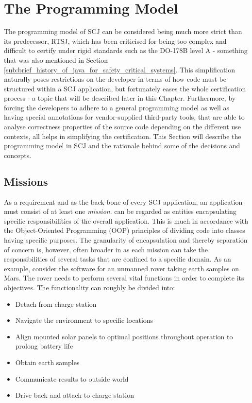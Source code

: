 \section{The Programming Model}
\label{section:programmingmodel}
The programming model of SCJ can be considered being much more strict than its predecessor, RTSJ, which has been criticised for being too complex and difficult to certify under rigid standards such as the DO-178B level A - something that was also mentioned in Section \ref{sub:brief_history_of_java_for_safety_critical_systems}. This simplification naturally poses restrictions on the developer in terms of how code must be structured within a SCJ application, but fortunately eases the whole certification process - a topic that will be described later in this Chapter. Furthermore, by forcing the developers to adhere to a general programming model as well as having special annotations for vendor-supplied third-party tools, that are able to analyse correctness properties of the source code depending on the different use contexts, all helps in simplifying the certification. This Section will describe the programming model in SCJ and the rationale behind some of the decisions and concepts.


\subsection{Missions}
As a requirement and as the back-bone of every SCJ application, an application must consist of at least one \textit{mission}.  can be regarded as entities encapsulating specific responsibilities of the overall application. This is much in accordance with the Object-Oriented Programming (OOP) principles of dividing code into classes having specific purposes. The granularity of encapsulation and thereby separation of concern is, however, often broader in  as each mission can take the responsibilities of several tasks that are confined to a specific domain. As an example, consider the software for an unmanned rover taking earth samples on Mars. The rover needs to perform several vital functions in order to complete its objectives. The functionality can roughly be divided into:

\begin{itemize}
	\item Detach from charge station
	\item Navigate the environment to specific locations
	\item Align mounted solar panels to optimal positions throughout operation to prolong battery life
	\item Obtain earth samples
	\item Communicate results to outside world
	\item Drive back and attach to charge station
\end{itemize}

